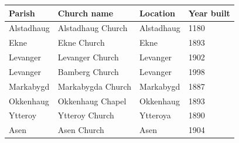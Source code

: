 \documentclass{article}
\begin{document}
\begin{tabular}{llll}
\toprule
Parish & Church name & Location & Year built \\
\midrule
Alstadhaug & Alstadhaug Church & Alstadhaug & 1180 \\
Ekne & Ekne Church & Ekne & 1893 \\
Levanger & Levanger Church & Levanger & 1902 \\
Levanger & Bamberg Church & Levanger & 1998 \\
Markabygd & Markabygda Church & Markabygd & 1887 \\
Okkenhaug & Okkenhaug Chapel & Okkenhaug & 1893 \\
Ytteroy & Ytteroy Church & Ytteroya & 1890 \\
Asen & Asen Church & Asen & 1904 \\
\bottomrule
\end{tabular}
\end{document}
